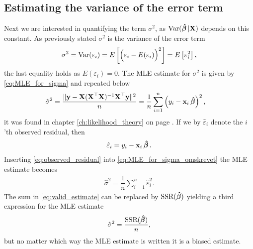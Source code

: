 \subsection{Estimating the variance of the error term}
Next we are interested in quantifying the term $\sigma^2$, as $\operatorname{\text{Var}}(\operatorname{\boldsymbol{\hat{\beta}}}|\mathbf{X})$ depends on this constant.
As previously stated $\sigma^2$ is the variance of the error term
\begin{align*}
    \sigma^2 = \operatorname{\text{Var}}(\varepsilon_i) =  E\left[\Big(\varepsilon_i - E(\varepsilon_i)\Big)^2\right] = E\left[\varepsilon_i^2\right],
\end{align*}
the last equality holds as $E(\varepsilon_i) = 0$.
The MLE estimate for $\sigma^2$ is given by \eqref{eq:MLE_for_sigma} and repeated below
\begin{align}\label{eq:MLE_for_sigma_omskrevet}
    \hat{\sigma}^2 &= \frac{\|\textbf{y} - \textbf{X}( \textbf{X}^\top\textbf{X} )^{-1}\textbf{X}^\top\textbf{y}\|^2}{n}
    = \dfrac{1}{n}\sum_{i=1}^n \left(y_i - \mathbf{x}_i\operatorname{\boldsymbol{\hat{\beta}}}\right)^2,
\end{align}
it was found in chapter \ref{ch:likelihood_theory} on page \pageref{eq:MLE_for_sigma}.
If we by $\hat{\varepsilon}_i$ denote the $i$'th observed residual, then
\begin{align}\label{eq:observed_residual}
    \hat{\varepsilon}_i = y_i - \mathbf{x}_i\operatorname{\boldsymbol{\hat{\beta}}}.
\end{align}
Inserting \eqref{eq:observed_residual} into \eqref{eq:MLE_for_sigma_omskrevet} the MLE estimate becomes
\begin{align}\label{eq:valid_estimate}
    \hat{\sigma}^2 = \dfrac{1}{n}\sum_{i=1}^n \hat{\varepsilon}_i^2.
\end{align}
The sum in \eqref{eq:valid_estimate} can be replaced by $\operatorname{\text{SSR}}(\operatorname{\boldsymbol{\hat{\beta}}})$ yielding a third expression for the MLE estimate
\begin{align}
    \hat{\sigma}^2 = \frac{\operatorname{\text{SSR}}(\operatorname{\boldsymbol{\hat{\beta}}})}{n},
\end{align}
but no matter which way the MLE estimate is written it is a biased estimate.

